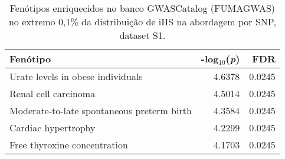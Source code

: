 \begin{table}[!htbp]
\centering

\begin{tabular}[t]{lrr}
\toprule
Fenótipo & -log$_{10}$(\emph{p}) & FDR\\
\midrule
Urate levels in obese individuals & 4.6378 & 0.0245\\
Renal cell carcinoma & 4.5014 & 0.0245\\
Moderate-to-late spontaneous preterm birth & 4.3584 & 0.0245\\
Cardiac hypertrophy & 4.2299 & 0.0245\\
Free thyroxine concentration & 4.1703 & 0.0245\\
\bottomrule
\end{tabular}

\caption{Fenótipos enriquecidos no banco GWASCatalog (FUMAGWAS) no extremo 0,1\% da distribuição de iHS na abordagem por SNP, dataset S1.}
\label{tab:ds1_fumagwas_ihs_persnp}

\end{table}

